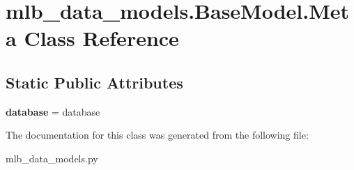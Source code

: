 \hypertarget{classmlb__data__models_1_1BaseModel_1_1Meta}{}\section{mlb\+\_\+data\+\_\+models.\+Base\+Model.\+Meta Class Reference}
\label{classmlb__data__models_1_1BaseModel_1_1Meta}
\subsection*{Static Public Attributes}
\begin{DoxyCompactItemize}
\item 
{\bfseries database} = database\hypertarget{classmlb__data__models_1_1BaseModel_1_1Meta_a56392d93ca8c5e9b26c8b7d6d9024d31}{}\label{classmlb__data__models_1_1BaseModel_1_1Meta_a56392d93ca8c5e9b26c8b7d6d9024d31}

\end{DoxyCompactItemize}


The documentation for this class was generated from the following file\+:\begin{DoxyCompactItemize}
\item 
mlb\+\_\+data\+\_\+models.\+py\end{DoxyCompactItemize}
